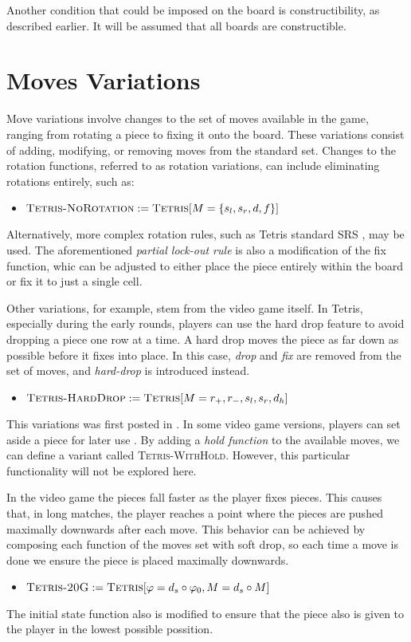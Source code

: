 Another condition that could be imposed on the board is constructibility, as described earlier. It will be assumed that all boards are constructible.

\section{Moves Variations}

Move variations involve changes to the set of moves available in the game, ranging from rotating a piece to fixing it onto the board. These variations consist of adding, modifying, or removing moves from the standard set. Changes to the rotation functions, referred to as rotation variations, can include eliminating rotations entirely, such as:

\begin{itemize} \item $\textsc{Tetris-NoRotation} := \textsc{Tetris}[M = \{s_l, s_r, d, f\}]$ \end{itemize}

Alternatively, more complex rotation rules, such as Tetris standard SRS \cite{WikiFandom}, may be used. The aforementioned \emph{partial lock-out rule} is also a modification of the fix function, whic can be adjusted to either place the piece entirely within the board or fix it to just a single cell.

Other variations, for example, stem from the video game itself. In Tetris, especially during the early rounds, players can use the hard drop feature to avoid dropping a piece one row at a time. A hard drop moves the piece as far down as possible before it fixes into place. In this case, \emph{drop} and \emph{fix} are removed from the set of moves, and \emph{hard-drop} is introduced instead.

\begin{itemize} \item $\textsc{Tetris-HardDrop} := \textsc{Tetris}[M = { r_+, r_-, s_l, s_r, d_h }]$ \end{itemize}

This variations was first posted in \cite{TIH}. In some video game versions, players can set aside a piece for later use \cite{WikiFandom}. By adding a \emph{hold function} to the available moves, we can define a variant called \textsc{Tetris-WithHold}. However, this particular functionality will not be explored here.

\vspace{1em}


In the video game the pieces fall faster as the player fixes pieces. This causes that, in long matches, the player reaches a point where the pieces are pushed maximally downwards after each move. This behavior can be achieved by composing each function of the moves set with soft drop, so each time a move is done we ensure the piece is placed maximally downwards.   
\begin{itemize}
  \item $\textsc{Tetris-20G} := \textsc{Tetris}[\varphi = d_s \circ \varphi_0, M = d_s \circ M]$
\end{itemize}

The initial state function also is modified to ensure that the piece also is given to the player in the lowest possible possition. 

